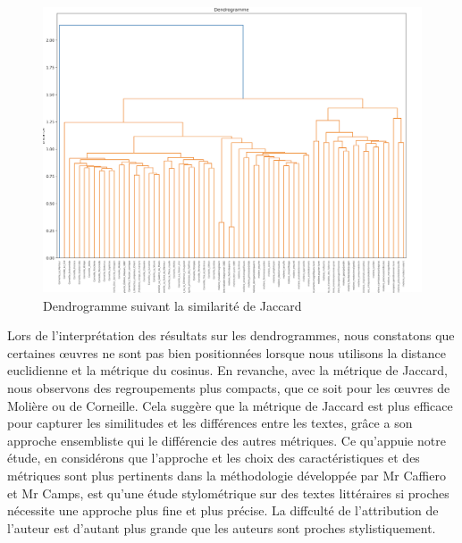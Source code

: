 \newpage
\begin{figure}[htbp]
  \centering
  \includegraphics[width=15cm]{Ressources/Dendo_Jacard.png}
  \caption{Dendrogramme suivant la similarité de Jaccard}
  \label{fig:images}
\end{figure}

\newpage

\hspace{0,5cm}Lors de l'interprétation des résultats sur les dendrogrammes, nous constatons
que certaines œuvres ne sont pas bien positionnées lorsque nous utilisons la
distance euclidienne et la métrique du cosinus. En revanche, avec la métrique de
Jaccard, nous observons des regroupements plus compacts, que ce soit pour les
œuvres de Molière ou de Corneille. Cela suggère que la métrique de Jaccard est
plus efficace pour capturer les similitudes et les différences entre les textes,
grâce a son approche ensembliste qui le différencie des autres métriques. 
Ce qu'appuie notre étude, en considérons que
l'approche et les choix des caractéristiques et des métriques sont plus pertinents
dans la méthodologie développée par Mr Caffiero et Mr Camps, est qu'une étude
stylométrique sur des textes littéraires si proches nécessite une approche plus
fine et plus précise. La diffculté de l'attribution de l'auteur est d'autant
plus grande que les auteurs sont proches stylistiquement.